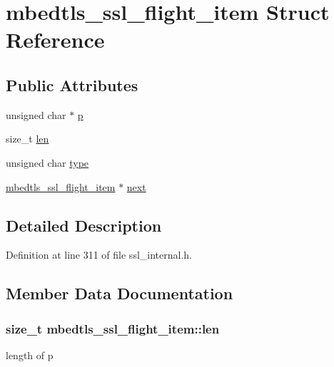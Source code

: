 \hypertarget{structmbedtls__ssl__flight__item}{\section{mbedtls\-\_\-ssl\-\_\-flight\-\_\-item Struct Reference}
\label{structmbedtls__ssl__flight__item}
}
\subsection*{Public Attributes}
\begin{DoxyCompactItemize}
\item 
unsigned char $\ast$ \hyperlink{structmbedtls__ssl__flight__item_aad7b11522ddc6f7ea383231b9e3cedf1}{p}
\item 
size\-\_\-t \hyperlink{structmbedtls__ssl__flight__item_a2a707163f2b8728b666071f1d7b120f9}{len}
\item 
unsigned char \hyperlink{structmbedtls__ssl__flight__item_acdfcb3e1d7848e7f09d9c00defa90e4b}{type}
\item 
\hyperlink{structmbedtls__ssl__flight__item}{mbedtls\-\_\-ssl\-\_\-flight\-\_\-item} $\ast$ \hyperlink{structmbedtls__ssl__flight__item_a10b26523d65d985a745e517312ca4ca1}{next}
\end{DoxyCompactItemize}


\subsection{Detailed Description}


Definition at line 311 of file ssl\-\_\-internal.\-h.



\subsection{Member Data Documentation}
\hypertarget{structmbedtls__ssl__flight__item_a2a707163f2b8728b666071f1d7b120f9}{
\subsubsection[{len}]{\setlength{\rightskip}{0pt plus 5cm}size\-\_\-t mbedtls\-\_\-ssl\-\_\-flight\-\_\-item\-::len}}\label{structmbedtls__ssl__flight__item_a2a707163f2b8728b666071f1d7b120f9}
length of p 

